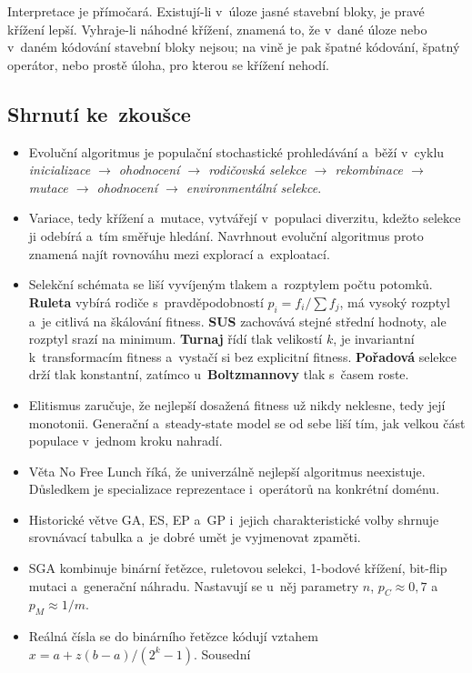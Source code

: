 \documentclass[11pt,a4paper]{article}
\theoremstyle{definition}
\begin{document}
Interpretace je přímočará. Existují-li v~úloze jasné stavební bloky, je pravé křížení
lepší. Vyhraje-li náhodné křížení, znamená to, že v~dané úloze nebo v~daném kódování
stavební bloky nejsou; na vině je pak špatné kódování, špatný operátor, nebo prostě
úloha, pro kterou se křížení nehodí.

\subsection{Shrnutí ke~zkoušce}

\begin{itemize}
\item Evoluční algoritmus je populační stochastické prohledávání a~běží v~cyklu
  \emph{inicializace $\to$ ohodnocení $\to$ rodičovská selekce $\to$ rekombinace $\to$
  mutace $\to$ ohodnocení $\to$ environmentální selekce}.
\item Variace, tedy křížení a~mutace, vytvářejí v~populaci diverzitu, kdežto selekce ji
  odebírá a~tím směřuje hledání. Navrhnout evoluční algoritmus proto znamená najít rovnováhu
  mezi explorací a~exploatací.
\item Selekční schémata se liší vyvíjeným tlakem a~rozptylem počtu potomků. \textbf{Ruleta}
  vybírá rodiče s~pravděpodobností $p_i = f_i/\sum f_j$, má vysoký rozptyl a~je citlivá na
  škálování fitness. \textbf{SUS} zachovává stejné střední hodnoty, ale rozptyl srazí na
  minimum. \textbf{Turnaj} řídí tlak velikostí $k$, je invariantní k~transformacím fitness
  a~vystačí si bez explicitní fitness. \textbf{Pořadová} selekce drží tlak konstantní,
  zatímco u~\textbf{Boltzmannovy} tlak s~časem roste.
\item Elitismus zaručuje, že nejlepší dosažená fitness už nikdy neklesne, tedy její monotonii.
  Generační a~steady-state model se od sebe liší tím, jak velkou část populace v~jednom kroku
  nahradí.
\item Věta No Free Lunch říká, že univerzálně nejlepší algoritmus neexistuje. Důsledkem je
  specializace reprezentace i~operátorů na konkrétní doménu.
\item Historické větve GA, ES, EP a~GP i~jejich charakteristické volby shrnuje srovnávací
  tabulka a~je dobré umět je vyjmenovat zpaměti.
\item SGA kombinuje binární řetězce, ruletovou selekci, 1-bodové křížení, bit-flip mutaci
  a~generační náhradu. Nastavují se u~něj parametry $n$, $p_C \approx 0{,}7$
  a~$p_M \approx 1/m$.
\item Reálná čísla se do binárního řetězce kódují vztahem $x = a + z(b-a)/(2^k-1)$. Sousední

\end{itemize}
\end{document}
